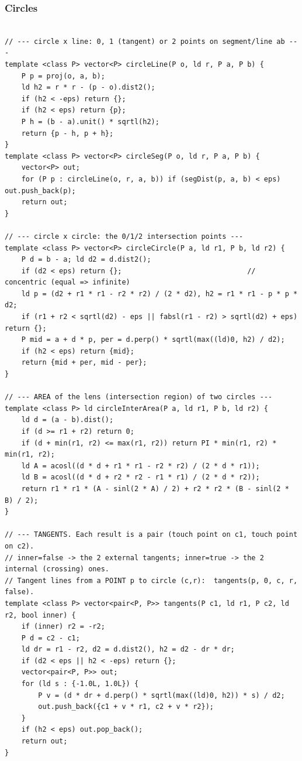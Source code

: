 \documentclass[9pt,a4paper,twocolumn]{extarticle}
\begin{document}
\filbreak
\subsubsection{Circles}
\nopagebreak
\begin{lstlisting}

// --- circle x line: 0, 1 (tangent) or 2 points on segment/line ab ---
template <class P> vector<P> circleLine(P o, ld r, P a, P b) {
    P p = proj(o, a, b);
    ld h2 = r * r - (p - o).dist2();
    if (h2 < -eps) return {};
    if (h2 < eps) return {p};
    P h = (b - a).unit() * sqrtl(h2);
    return {p - h, p + h};
}
template <class P> vector<P> circleSeg(P o, ld r, P a, P b) {
    vector<P> out;
    for (P p : circleLine(o, r, a, b)) if (segDist(p, a, b) < eps) out.push_back(p);
    return out;
}

// --- circle x circle: the 0/1/2 intersection points ---
template <class P> vector<P> circleCircle(P a, ld r1, P b, ld r2) {
    P d = b - a; ld d2 = d.dist2();
    if (d2 < eps) return {};                              // concentric (equal => infinite)
    ld p = (d2 + r1 * r1 - r2 * r2) / (2 * d2), h2 = r1 * r1 - p * p * d2;
    if (r1 + r2 < sqrtl(d2) - eps || fabsl(r1 - r2) > sqrtl(d2) + eps) return {};
    P mid = a + d * p, per = d.perp() * sqrtl(max((ld)0, h2) / d2);
    if (h2 < eps) return {mid};
    return {mid + per, mid - per};
}

// --- AREA of the lens (intersection region) of two circles ---
template <class P> ld circleInterArea(P a, ld r1, P b, ld r2) {
    ld d = (a - b).dist();
    if (d >= r1 + r2) return 0;
    if (d + min(r1, r2) <= max(r1, r2)) return PI * min(r1, r2) * min(r1, r2);
    ld A = acosl((d * d + r1 * r1 - r2 * r2) / (2 * d * r1));
    ld B = acosl((d * d + r2 * r2 - r1 * r1) / (2 * d * r2));
    return r1 * r1 * (A - sinl(2 * A) / 2) + r2 * r2 * (B - sinl(2 * B) / 2);
}

// --- TANGENTS. Each result is a pair (touch point on c1, touch point on c2).
// inner=false -> the 2 external tangents; inner=true -> the 2 internal (crossing) ones.
// Tangent lines from a POINT p to circle (c,r):  tangents(p, 0, c, r, false).
template <class P> vector<pair<P, P>> tangents(P c1, ld r1, P c2, ld r2, bool inner) {
    if (inner) r2 = -r2;
    P d = c2 - c1;
    ld dr = r1 - r2, d2 = d.dist2(), h2 = d2 - dr * dr;
    if (d2 < eps || h2 < -eps) return {};
    vector<pair<P, P>> out;
    for (ld s : {-1.0L, 1.0L}) {
        P v = (d * dr + d.perp() * sqrtl(max((ld)0, h2)) * s) / d2;
        out.push_back({c1 + v * r1, c2 + v * r2});
    }
    if (h2 < eps) out.pop_back();
    return out;
}


\end{lstlisting}
\end{document}
